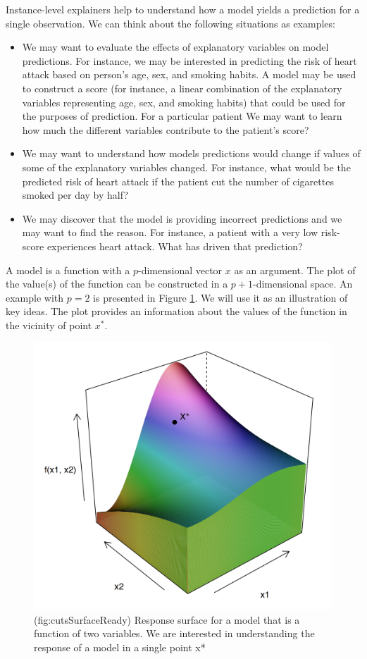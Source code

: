 \documentclass[]{krantz}
\providecommand{\tightlist}{%
  \setlength{\itemsep}{0pt}\setlength{\parskip}{0pt}}
\theoremstyle{definition}
\theoremstyle{definition}
\theoremstyle{definition}
\theoremstyle{remark}
\begin{document}
Instance-level explainers help to understand how a model yields a
prediction for a single observation. We can think about the following
situations as examples:

\begin{itemize}
\tightlist
\item
  We may want to evaluate the effects of explanatory variables on model
  predictions. For instance, we may be interested in predicting the risk
  of heart attack based on person's age, sex, and smoking habits. A
  model may be used to construct a score (for instance, a linear
  combination of the explanatory variables representing age, sex, and
  smoking habits) that could be used for the purposes of prediction. For
  a particular patient We may want to learn how much the different
  variables contribute to the patient's score?
\item
  We may want to understand how models predictions would change if
  values of some of the explanatory variables changed. For instance,
  what would be the predicted risk of heart attack if the patient cut
  the number of cigarettes smoked per day by half?
\item
  We may discover that the model is providing incorrect predictions and
  we may want to find the reason. For instance, a patient with a very
  low risk-score experiences heart attack. What has driven that
  prediction?
\end{itemize}

A model is a function with a \(p\)-dimensional vector \(x\) as an
argument. The plot of the value(s) of the function can be constructed in
a \(p+1\)-dimensional space. An example with \(p=2\) is presented in
Figure \ref{fig:cutsSurfaceReady}. We will use it as an illustration of
key ideas. The plot provides an information about the values of the
function in the vicinity of point \(x^*\).

\begin{figure}

{\centering \includegraphics[width=0.6\linewidth]{figure/cuts_surface_ready_punkt} 

}

\caption{(fig:cutsSurfaceReady) Response surface for a model that is a function of two variables. We are interested in understanding the response of a model in a single point x*}\label{fig:cutsSurfaceReady}
\end{figure}
\end{document}
